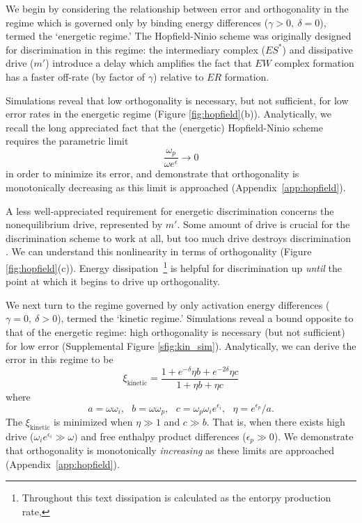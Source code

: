 We begin by considering the relationship between error and orthogonality in the regime which is governed only by binding energy differences ($\gamma >0, \ \delta=0$), termed the `energetic regime.'  The Hopfield-Ninio scheme was originally designed for discrimination in this regime: the intermediary complex ($ES^*$) and dissipative drive ($m'$) introduce a delay which amplifies the fact that $EW$ complex formation has a faster off-rate (by factor of $\gamma$) relative to $ER$ formation.  

Simulations reveal that low orthogonality is necessary, but not sufficient, for low error rates in the energetic regime (Figure  \ref{fig:hopfield}(b)).  Analytically, we recall the long appreciated fact that the (energetic) Hopfield-Ninio scheme requires the parametric limit
\[
\frac{\omega_p}{\omega e^{\epsilon}}\rightarrow0 
\]
in order to minimize its error, and demonstrate that orthogonality is monotonically decreasing as this limit is approached (Appendix~\ref{app:hopfield}).

A less well-appreciated requirement for energetic discrimination concerns the nonequilibrium drive, represented by $m'.$  Some amount of drive is crucial for the discrimination scheme to work at all, but too much drive destroys discrimination \cite{Wong2018}.  We can understand this nonlinearity in terms of orthogonality (Figure  \ref{fig:hopfield}(c)).  Energy dissipation~\footnote{Throughout this text dissipation is calculated as the entorpy production rate, } is helpful for discrimination up {\it until} the point at which it begins to drive up orthogonality.

We next turn to the regime governed by only activation energy differences ($\gamma =0, \ \delta > 0$), termed the `kinetic regime.'  Simulations reveal a bound opposite to that of the energetic regime: high orthogonality is necessary (but not sufficient) for low error (Supplemental Figure \ref{sfig:kin_sim}).  Analytically, we can derive the error in this regime to be
\[
\xi_{\text{kinetic}} = \frac{1+e^{-\delta}\eta b+e^{-2\delta} \eta c}{1+\eta b+\eta c}
\]
where 
\[
a = \omega\omega_i, \ \ \ b = \omega\omega_p, \ \ \ c = \omega_p\omega_i e^{\epsilon_i}, \ \ \ \eta=e^{\epsilon_p}/a.
\]
The $\xi_{\text{kinetic}}$ is minimized when $\eta\gg1$ and $c\gg b.$  That is, when there exists high drive ($\omega_i e^{\epsilon_i}\gg\omega)$ and free enthalpy product differences ($\epsilon_p\gg0$).  We demonstrate that orthogonality is monotonically {\it increasing} as these limits are approached (Appendix~\ref{app:hopfield}).

